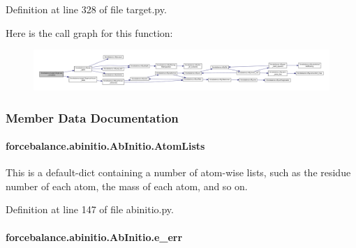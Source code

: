 Definition at line 328 of file target.\-py.



Here is the call graph for this function\-:\nopagebreak
\begin{figure}[H]
\begin{center}
\leavevmode
\includegraphics[width=350pt]{classforcebalance_1_1target_1_1Target_af6099ec09486213869dba2491bd8ea04_cgraph}
\end{center}
\end{figure}




\subsubsection{Member Data Documentation}
\hypertarget{classforcebalance_1_1abinitio_1_1AbInitio_a7e62a74e820ac0c5dd67f49155b95c41}{
\paragraph[{Atom\-Lists}]{\setlength{\rightskip}{0pt plus 5cm}forcebalance.\-abinitio.\-Ab\-Initio.\-Atom\-Lists\hspace{0.3cm}{\ttfamily [inherited]}}}\label{classforcebalance_1_1abinitio_1_1AbInitio_a7e62a74e820ac0c5dd67f49155b95c41}


This is a default-\/dict containing a number of atom-\/wise lists, such as the residue number of each atom, the mass of each atom, and so on. 



Definition at line 147 of file abinitio.\-py.

\hypertarget{classforcebalance_1_1abinitio_1_1AbInitio_aa569290969858e189935b3de37ead3f0}{
\paragraph[{e\-\_\-err}]{\setlength{\rightskip}{0pt plus 5cm}forcebalance.\-abinitio.\-Ab\-Initio.\-e\-\_\-err\hspace{0.3cm}{\ttfamily [inherited]}}}\label{classforcebalance_1_1abinitio_1_1AbInitio_aa569290969858e189935b3de37ead3f0}


